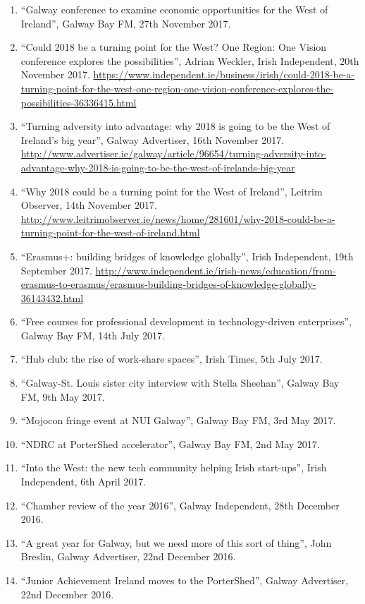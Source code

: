 \documentclass[10pt,a4paper]{res} %
\begin{document}
\begin{resume}
{\begin{enumerate}
\item ``Galway conference to examine economic opportunities for the West of Ireland'', Galway Bay FM, 27th November 2017.
\item ``Could 2018 be a turning point for the West? One Region: One Vision conference explores the possibilities'', Adrian Weckler, Irish Independent, 20th November 2017. \url{https://www.independent.ie/business/irish/could-2018-be-a-turning-point-for-the-west-one-region-one-vision-conference-explores-the-possibilities-36336415.html}
\item ``Turning adversity into advantage: why 2018 is going to be the West of Ireland's big year'', Galway Advertiser, 16th November 2017. \url{http://www.advertiser.ie/galway/article/96654/turning-adversity-into-advantage-why-2018-is-going-to-be-the-west-of-irelands-big-year}
\item ``Why 2018 could be a turning point for the West of Ireland'', Leitrim Observer, 14th November 2017. \url{http://www.leitrimobserver.ie/news/home/281601/why-2018-could-be-a-turning-point-for-the-west-of-ireland.html}
\item ``Erasmus+: building bridges of knowledge globally'', Irish Independent, 19th September 2017. \url{http://www.independent.ie/irish-news/education/from-erasmus-to-erasmus/erasmus-building-bridges-of-knowledge-globally-36143432.html}
\item ``Free courses for professional development in technology-driven enterprises'', Galway Bay FM, 14th July 2017.
\item ``Hub club: the rise of work-share spaces'', Irish Times, 5th July 2017.
\item ``Galway-St. Louis sister city interview with Stella Sheehan'', Galway Bay FM, 9th May 2017.
\item ``Mojocon fringe event at NUI Galway'', Galway Bay FM, 3rd May 2017.
\item ``NDRC at PorterShed accelerator'', Galway Bay FM, 2nd May 2017.
\item ``Into the West: the new tech community helping Irish start-ups'', Irish Independent, 6th April 2017.
\item ``Chamber review of the year 2016'', Galway Independent, 28th December 2016.
\item ``A great year for Galway, but we need more of this sort of thing'', John Breslin, Galway Advertiser, 22nd December 2016.
\item ``Junior Achievement Ireland moves to the PorterShed'', Galway Advertiser, 22nd December 2016.

\end{enumerate}}
\end{resume}
\end{document}
